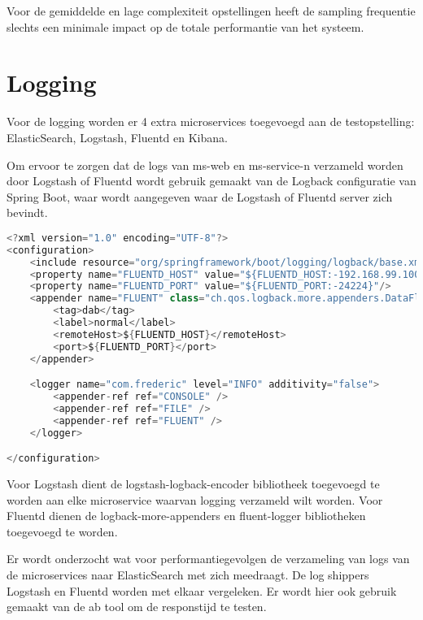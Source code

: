 Voor de gemiddelde en lage complexiteit opstellingen heeft de sampling frequentie slechts een minimale impact op de totale performantie van het systeem.

\section{Logging}

Voor de logging worden er 4 extra microservices toegevoegd aan de testopstelling: ElasticSearch, Logstash, Fluentd en Kibana.

Om ervoor te zorgen dat de logs van ms-web en ms-service-n verzameld worden door Logstash of Fluentd wordt gebruik gemaakt van de Logback configuratie van Spring Boot, waar wordt aangegeven waar de Logstash of Fluentd server zich bevindt.

\begin{lstlisting}[language=Java, basicstyle=\ttfamily\scriptsize, caption=Voorbeeld Fluentd logback configuratie]
<?xml version="1.0" encoding="UTF-8"?>
<configuration>
    <include resource="org/springframework/boot/logging/logback/base.xml"/>
    <property name="FLUENTD_HOST" value="${FLUENTD_HOST:-192.168.99.100}"/>
    <property name="FLUENTD_PORT" value="${FLUENTD_PORT:-24224}"/>
    <appender name="FLUENT" class="ch.qos.logback.more.appenders.DataFluentAppender">
        <tag>dab</tag>
        <label>normal</label>
        <remoteHost>${FLUENTD_HOST}</remoteHost>
        <port>${FLUENTD_PORT}</port>
    </appender>

    <logger name="com.frederic" level="INFO" additivity="false">
        <appender-ref ref="CONSOLE" />
        <appender-ref ref="FILE" />
        <appender-ref ref="FLUENT" />
    </logger>

</configuration>
\end{lstlisting}

Voor Logstash dient de logstash-logback-encoder bibliotheek toegevoegd te worden aan elke microservice waarvan logging verzameld wilt worden. Voor Fluentd dienen de logback-more-appenders en fluent-logger bibliotheken toegevoegd te worden.

Er wordt onderzocht wat voor performantiegevolgen de verzameling van logs van de microservices naar ElasticSearch met zich meedraagt. De log shippers Logstash en Fluentd worden met elkaar vergeleken.  Er wordt hier ook gebruik gemaakt van de ab tool om de responstijd te testen.

